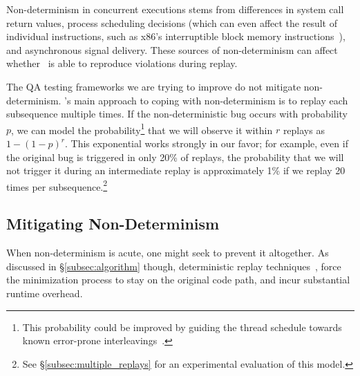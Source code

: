 Non-determinism in concurrent executions stems from
differences in system call return values, process scheduling decisions (which can
even affect the result of individual instructions, such as x86's
interruptible block memory instructions~\cite{Dunlap:2002:REI:844128.844148}),
and asynchronous signal
delivery. These sources of non-determinism can affect whether \projectname~is
able to reproduce violations during replay.

The QA testing frameworks we are
trying to improve do not mitigate non-determinism.
\projectname's main approach to coping with non-determinism
is to replay each subsequence multiple times. If the non-deterministic bug occurs with
probability $p$, we can model the probability\footnote{This probability could be improved by guiding the thread schedule
towards known error-prone interleavings~\cite{park2009ctrigger,park2009pres}.}
that we will observe it within $r$ replays as $1-(1-p)^{r}$. This exponential
works strongly in our favor; for example, even if the original bug is
triggered in only 20\% of replays, the probability that we will not trigger
it during an intermediate replay is approximately
1\% if we replay 20 times per subsequence.\footnote{See
\S\ref{subsec:multiple_replays} for an experimental evaluation of this model.}

\subsection{Mitigating Non-Determinism}
\label{subsec:mitigating}

When non-determinism is acute, one might seek to prevent it altogether.
As discussed in \S\ref{subsec:algorithm} though, deterministic replay techniques~\cite{Dunlap:2002:REI:844128.844148,Geels:2006:RDD:1267359.1267386},
force the minimization process to stay on the original code path, and incur
substantial runtime overhead.

